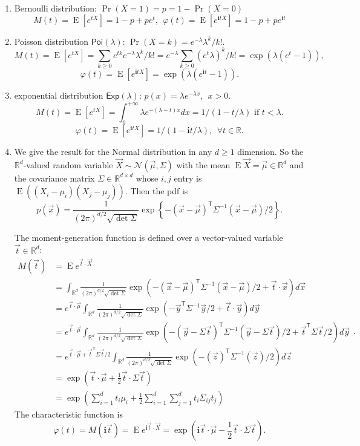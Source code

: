 \documentclass[  11pt]{article}
\newcommand{\e}{ \operatorname{E}}
\newcommand{\ii}{\mathbf{i}}
\newcommand{\Real}{{\mathbb{R}}}
\newcommand{\tr}{{\textsf{T}}}
\begin{document}
\begin{ExerciseList}
\Answer 
\begin{enumerate}
\item Bernoulli distribution: $\Pr(X=1)=p=1-\Pr(X=0)$
\[M(t)=\e[e^{t X}] = 1-p + pe^t, ~~\varphi(t)= \e[e^{\ii t X}]= 1-p + pe^{\ii t} \]
\item  Poisson distribution $\mathsf{Poi}(\lambda)$:
$\Pr(X=k)=e^{-\lambda }  \lambda^k / k!$.
\[M(t)=\e[e^{t X}] = \sum_{k\geq 0} e^{tk} e^{-\lambda }  \lambda^k / k!
=   e^{-\lambda }   \sum_{k\geq 0}  (e^t \lambda) ^k / k! 
=\exp\left(  \lambda (e^t -1) \right) ,\]
\[
\varphi(t)= \e[e^{\ii t X}]= \exp\left(  \lambda (e^{\ii t} -1) \right).\]
\item 
exponential distribution $\mathsf{Exp}(\lambda)$:
$ p(x)=\lambda e^{-\lambda x}, ~~x>0$.
\[M(t)=\e[e^{t X}]  = \int_0^{+\infty}   \lambda e^{-(\lambda-t) x} dx
=  1 /(1-t/\lambda) \mbox{ if } t < \lambda. \]
\[
\varphi(t)= \e[e^{\ii t X}]=1 /(1-\ii t/\lambda) , ~~\forall t\in \Real.
\]
\item We give the result for the Normal distribution in any $d\geq 1$ dimension.
So the $\Real^d$-valued random variable  $\vec{X}\sim \mathcal{N}(\vec{\mu}, \Sigma)$ with the mean $\e \vec{X}=\vec{\mu}\in \Real^d$
and the covariance matrix $\Sigma \in \Real^{d\times d}$ whose $i,j$ entry is
 $\e((X_i-\mu_i)( X_j-\mu_j))$. Then the pdf is 
$$p(\vec{x})= \frac{1}{(2\pi)^{d/2}\sqrt{\det{\Sigma}}}\exp\left \{  - (\vec{x}-\vec{\mu})^\tr \Sigma^{-1}  (\vec{x}-\vec{\mu})/2\right\}.$$

The moment-generation function is defined over a vector-valued variable $\vec{t}\in\Real^d$:
\[
\begin{split}
M(\vec{t})
&= \e e^{\vec{t} \cdot \vec{X}}
\\
&= \int_{\Real^d} 
\frac{1}{(2\pi)^{d/2}\sqrt{\det{\Sigma}}}
\exp\left(  - (\vec{x}-\vec{\mu})^\tr \Sigma^{-1}  (\vec{x}-\vec{\mu})/2
+\vec{t} \cdot \vec{x}\right)  d \vec{x}
\\
&=e^{\vec{t} \cdot \vec{\mu}} \int_{\Real^d} 
\frac{1}{(2\pi)^{d/2}\sqrt{\det{\Sigma}}}
\exp\left(  - \vec{y}^\tr \Sigma^{-1}\vec{y}/2
+\vec{t}\cdot \vec{y}\right)  d \vec{y}
\\
&=
e^{\vec{t} \cdot \vec{\mu}} \int_{\Real^d} 
\frac{1}{(2\pi)^{d/2}\sqrt{\det{\Sigma}}}
\exp\left(  - (\vec{y}-\Sigma \vec{t})^\tr \Sigma^{-1}(\vec{y}-\Sigma \vec{t})/2
+\vec{t}^\tr \Sigma \vec{t}/2\right)  d \vec{y}
\\
&=e^{\vec{t} \cdot \vec{\mu}+\vec{t}^\tr \Sigma \vec{t}/2 } \int_{\Real^d} 
\frac{1}{(2\pi)^{d/2}\sqrt{\det{\Sigma}}}
\exp\left(  - (\vec{z} )^\tr \Sigma^{-1}(\vec{z} )/2
 \right)  d \vec{z}
 \\
 &=\exp\left( \vec{t} \cdot \vec{\mu}+ \frac12 \vec{t}\cdot \Sigma \vec{t}   \right)
 \\
 &=\exp\left( \sum_{i=1}^dt_i \mu_i + \frac12 \sum_{i=1}^d\sum_{j=1}^d t_i \Sigma_{ij}t_j\right)
\end{split}.
\]
The characteristic function is 
\[
\varphi(t) = M(\ii \vec{t})= \e e^{\ii \vec{t} \cdot \vec{X}}=
\exp\left( \ii \vec{t} \cdot \vec{\mu}- \frac12 \vec{t}\cdot \Sigma \vec{t}   \right).
\]
\end{enumerate}


\end{ExerciseList}
\end{document}
